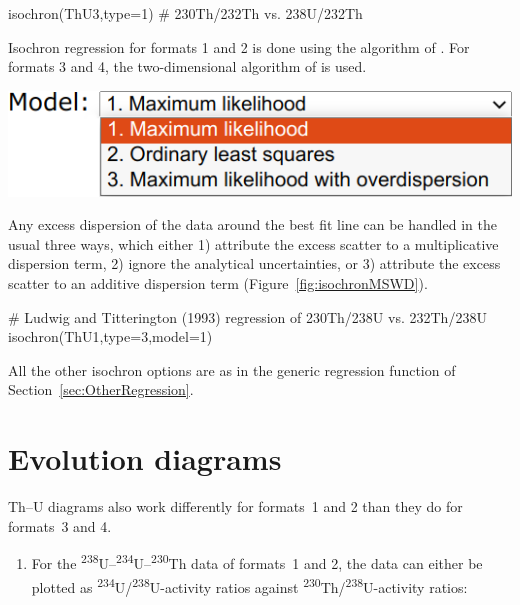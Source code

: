 \begin{refsection}
\begin{console}
isochron(ThU3,type=1) # 230Th/232Th vs. 238U/232Th
\end{console}

Isochron regression for formats 1 and 2 is done using the algorithm of
\citet{ludwig1994}. For formats 3 and 4, the two-dimensional algorithm
of \citet{york2004} is used.\\

\noindent\begin{minipage}[t]{.45\linewidth}
\strut\vspace*{-\baselineskip}\newline
\includegraphics[width=\linewidth]{../figures/PbPbIsochronModels.png}
\end{minipage}
\begin{minipage}[t]{.55\linewidth}
  Any excess dispersion of the data around the best fit line can be
  handled in the usual three ways, which either 1) attribute the
  excess scatter to a multiplicative dispersion term, 2) ignore the
  analytical uncertainties, or 3) attribute the excess scatter to an
  additive dispersion term (Figure~\ref{fig:isochronMSWD}).
\end{minipage}

\begin{script}
# Ludwig and Titterington (1993) regression of 230Th/238U vs. 232Th/238U
isochron(ThU1,type=3,model=1)
\end{script}

All the other isochron options are as in the generic regression
function of Section~\ref{sec:OtherRegression}.

\section{Evolution diagrams}

Th--U diagrams also work differently for formats~1 and 2 than they do
for formats~3 and 4.

\begin{enumerate}

\item For the
  \textsuperscript{238}U--\textsuperscript{234}U--\textsuperscript{230}Th
  data of formats~1 and 2, the data can either be plotted as
  \textsuperscript{234}U/\textsuperscript{238}U-activity ratios
  against \textsuperscript{230}Th/\textsuperscript{238}U-activity
  ratios:


\end{enumerate}
\end{refsection}
